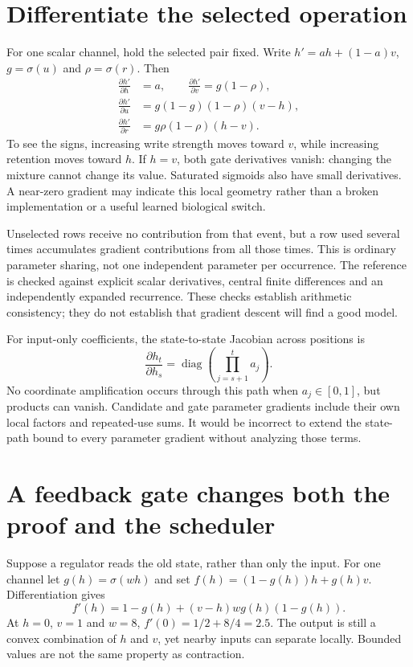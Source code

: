 \section{Differentiate the selected operation}
For one scalar channel, hold the selected pair fixed. Write $h'=ah+(1-a)v$,
$g=\sigma(u)$ and $\rho=\sigma(r)$. Then
\begin{align}
 \frac{\partial h'}{\partial h}&=a,\qquad
 \frac{\partial h'}{\partial v}=g(1-\rho),\\
 \frac{\partial h'}{\partial u}&=g(1-g)(1-\rho)(v-h),\\
 \frac{\partial h'}{\partial r}&=g\rho(1-\rho)(h-v).
 \label{eq:derivatives}
\end{align}
To see the signs, increasing write strength moves toward $v$, while increasing
retention moves toward $h$. If $h=v$, both gate derivatives vanish: changing
the mixture cannot change its value. Saturated sigmoids also have small
derivatives. A near-zero gradient may indicate this local geometry rather than
a broken implementation or a useful learned biological switch.

Unselected rows receive no contribution from that event, but a row used several
times accumulates gradient contributions from all those times. This is ordinary
parameter sharing, not one independent parameter per occurrence. The reference
is checked against explicit scalar derivatives, central finite differences and
an independently expanded recurrence. These checks establish arithmetic
consistency; they do not establish that gradient descent will find a good model.

For input-only coefficients, the state-to-state Jacobian across positions is
\begin{equation}
 \frac{\partial h_t}{\partial h_s}
 =\operatorname{diag}\left(\prod_{j=s+1}^{t}a_j\right).
\end{equation}
No coordinate amplification occurs through this path when $a_j\in[0,1]$,
but products can vanish. Candidate and gate parameter gradients include their
own local factors and repeated-use sums. It would be incorrect to extend the
state-path bound to every parameter gradient without analyzing those terms.

\section{A feedback gate changes both the proof and the scheduler}
Suppose a regulator reads the old state, rather than only the input. For one
channel let $g(h)=\sigma(wh)$ and set $f(h)=(1-g(h))h+g(h)v$.
Differentiation gives
\begin{equation}
 f'(h)=1-g(h)+(v-h)w g(h)(1-g(h)).
\end{equation}
At $h=0$, $v=1$ and $w=8$, $f'(0)=1/2+8/4=2.5$.
The output is still a convex combination of $h$ and $v$, yet nearby inputs
can separate locally. Bounded values are not the same property as contraction.

